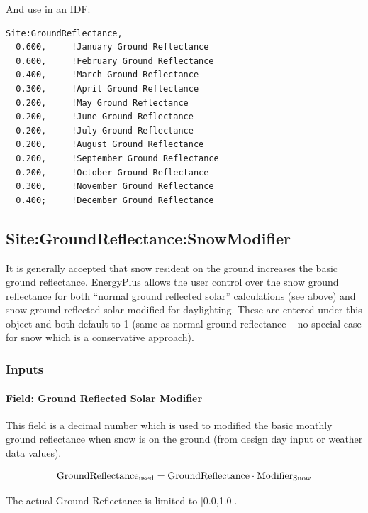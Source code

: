 And use in an IDF:

\begin{lstlisting}
Site:GroundReflectance,
  0.600,     !January Ground Reflectance
  0.600,     !February Ground Reflectance
  0.400,     !March Ground Reflectance
  0.300,     !April Ground Reflectance
  0.200,     !May Ground Reflectance
  0.200,     !June Ground Reflectance
  0.200,     !July Ground Reflectance
  0.200,     !August Ground Reflectance
  0.200,     !September Ground Reflectance
  0.200,     !October Ground Reflectance
  0.300,     !November Ground Reflectance
  0.400;     !December Ground Reflectance
\end{lstlisting}

\subsection{Site:GroundReflectance:SnowModifier}\label{sitegroundreflectancesnowmodifier}

It is generally accepted that snow resident on the ground increases the basic ground reflectance. EnergyPlus allows the user control over the snow ground reflectance for both ``normal ground reflected solar'' calculations (see above) and snow ground reflected solar modified for daylighting. These are entered under this object and both default to 1 (same as normal ground reflectance -- no special case for snow which is a conservative approach).

\subsubsection{Inputs}\label{inputs-20-003}

\paragraph{Field: Ground Reflected Solar Modifier}\label{field-ground-reflected-solar-modifier}

This field is a decimal number which is used to modified the basic monthly ground reflectance when snow is on the ground (from design day input or weather data values).

\begin{equation}
\rm{GroundReflectance}_{\rm{used}} = \rm{GroundReflectance} \cdot \rm{Modifier}_{\rm{Snow}}
\end{equation}

The actual Ground Reflectance is limited to {[}0.0,1.0{]}.

